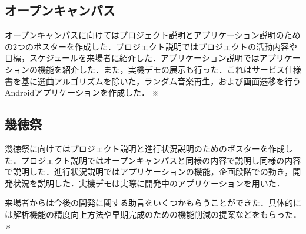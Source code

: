 \subsection{オープンキャンパス}
\par オープンキャンパスに向けてはプロジェクト説明とアプリケーション説明のための2つのポスターを作成した．プロジェクト説明ではプロジェクトの活動内容や目標，スケジュールを来場者に紹介した．アプリケーション説明ではアプリケーションの機能を紹介した．また，実機デモの展示も行った．これはサービス仕様書を基に選曲アルゴリズムを除いた，ランダム音楽再生，および画面遷移を行うAndroidアプリケーションを作成した．
※

\subsection{幾徳祭}
\par 幾徳祭に向けてはプロジェクト説明と進行状況説明のためのポスターを作成した．プロジェクト説明ではオープンキャンパスと同様の内容で説明し同様の内容で説明した．進行状況説明ではアプリケーションの機能，企画段階での動き，開発状況を説明した．実機デモは実際に開発中のアプリケーションを用いた．
\par 来場者からは今後の開発に関する助言をいくつかもらうことができた．具体的には解析機能の精度向上方法や早期完成のための機能削減の提案などをもらった．
※

